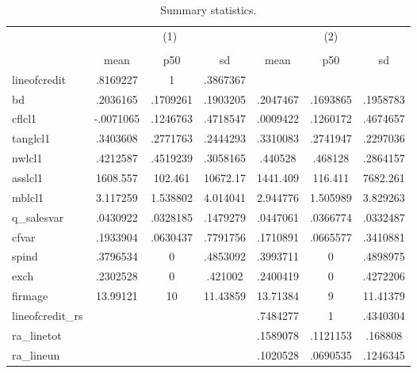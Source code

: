 \begin{table}[htbp]\centering
\def\sym#1{\ifmmode^{#1}\else\(^{#1}\)\fi}
\caption{Summary statistics.}
\begin{tabular}{l*{2}{ccc}}
\hline\hline
            &\multicolumn{3}{c}{(1)}               &\multicolumn{3}{c}{(2)}               \\
            &\multicolumn{3}{c}{}                  &\multicolumn{3}{c}{}                  \\
            &        mean&         p50&          sd&        mean&         p50&          sd\\
\hline
lineofcredit&    .8169227&           1&    .3867367&            &            &            \\
bd          &    .2036165&    .1709261&    .1903205&    .2047467&    .1693865&    .1958783\\
cflcl1      &   -.0071065&    .1246763&    .4718547&    .0009422&    .1260172&    .4674657\\
tanglcl1    &    .3403608&    .2771763&    .2444293&    .3310083&    .2741947&    .2297036\\
nwlcl1      &    .4212587&    .4519239&    .3058165&     .440528&     .468128&    .2864157\\
asslcl1     &    1608.557&     102.461&    10672.17&    1441.409&     116.411&    7682.261\\
mblcl1      &    3.117259&    1.538802&    4.014041&    2.944776&    1.505989&    3.829263\\
q\_salesvar  &    .0430922&    .0328185&    .1479279&    .0447061&    .0366774&    .0332487\\
cfvar       &    .1933904&    .0630437&    .7791756&    .1710891&    .0665577&    .3410881\\
spind       &    .3796534&           0&    .4853092&    .3993711&           0&    .4898975\\
exch        &    .2302528&           0&     .421002&    .2400419&           0&    .4272206\\
firmage     &    13.99121&          10&    11.43859&    13.71384&           9&    11.41379\\
lineofcredit\_rs&            &            &            &    .7484277&           1&    .4340304\\
ra\_linetot  &            &            &            &    .1589078&    .1121153&     .168808\\
ra\_lineun   &            &            &            &    .1020528&    .0690535&    .1246345\\

\end{tabular}
\end{table}
